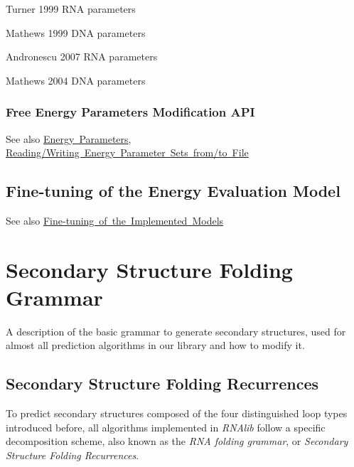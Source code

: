 \begin{DoxyItemize}
\item Turner 1999 R\+NA parameters
\item Mathews 1999 D\+NA parameters
\item Andronescu 2007 R\+NA parameters
\item Mathews 2004 D\+NA parameters
\end{DoxyItemize}\hypertarget{energy_evaluation_sec_energy_parameters_api}{}\subsubsection{Free Energy Parameters Modification A\+PI}\label{energy_evaluation_sec_energy_parameters_api}
\begin{DoxySeeAlso}{See also}
\mbox{\hyperlink{group__energy__parameters}{Energy Parameters}}, \mbox{\hyperlink{group__energy__parameters__rw}{Reading/\+Writing Energy Parameter Sets from/to File}}
\end{DoxySeeAlso}
\hypertarget{energy_evaluation_sec_model_details}{}\subsection{Fine-\/tuning of the Energy Evaluation Model}\label{energy_evaluation_sec_model_details}
\begin{DoxySeeAlso}{See also}
\mbox{\hyperlink{group__model__details}{Fine-\/tuning of the Implemented Models}}
\end{DoxySeeAlso}
 \hypertarget{folding_grammar}{}\section{Secondary Structure Folding Grammar}\label{folding_grammar}
A description of the basic grammar to generate secondary structures, used for almost all prediction algorithms in our library and how to modify it.\hypertarget{folding_grammar_sec_recursions}{}\subsection{Secondary Structure Folding Recurrences}\label{folding_grammar_sec_recursions}
To predict secondary structures composed of the four distinguished loop types introduced before, all algorithms implemented in {\itshape R\+N\+Alib} follow a specific decomposition scheme, also known as the {\itshape R\+NA folding grammar}, or {\itshape Secondary Structure Folding Recurrences}.

